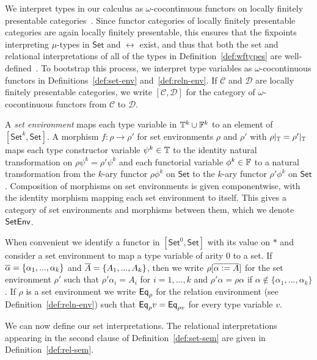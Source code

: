 \documentclass{lmcs}
\theoremstyle{plain}\newtheorem{satz}[thm]{Satz}
\newcommand{\set}{\mathsf{Set}}
\newcommand{\C}{\mathcal{C}}
\newcommand{\D}{\mathcal{D}}
\begin{document}
We interpret types in our calculus as $\omega$-cocontinuous functors
on locally finitely presentable categories~\cite{ar94}. Since functor
categories of locally finitely presentable categories are again
locally finitely presentable, this ensures that the fixpoints
interpreting $\mu$-types in $\set$ and $\rel$ exist, and thus that
both the set and relational interpretations of all of the types in
Definition~\ref{def:wftypes} are well-defined~\cite{jp19}. To
bootstrap this process, we interpret type variables as
$\omega$-cocontinuous functors in Definitions~\ref{def:set-env}
and~\ref{def:reln-env}. If $\C$ and $\D$ are locally finitely
presentable categories, we write $[\C,\D]$ for the category of
$\omega$-cocontinuous functors from $\C$ to $\D$.

\begin{defi}\label{def:set-env}
A {\em set environment} maps each type variable in $\mathbb{T}^k \cup
\mathbb{F}^k$ to an element of $[\set^k,\set]$.  A morphism $f : \rho \to
\rho'$ for set environments $\rho$ and $\rho'$ with $\rho|_{\mathbb{T}} =
\rho'|_{\mathbb{T}}$ maps each type constructor variable $\psi^k \in \mathbb{T}$
to the identity natural transformation on $\rho \psi^k = \rho'\psi^k$
and each functorial variable $\phi^k \in \mathbb{F}$ to a natural
transformation from the $k$-ary functor $\rho \phi^k$ on $\set$ to the
$k$-ary functor $\rho' \phi^k$ on $\set$.  Composition of morphisms on
set environments is given componentwise, with the identity morphism
mapping each set environment to itself. This gives a category of set
environments and morphisms between them, which we denote $\mathsf{SetEnv}$.
\end{defi}
When convenient we identify a functor in $[\set^0, \set]$ with its
value on $\ast$ and consider a set environment to map a type variable
of arity $0$ to a set.  If $\overline{\alpha} = \{\alpha_1,...,\alpha_k\}$
and $\overline{A} = \{A_1,...,A_k\}$, then we write $\rho[\overline{\alpha := A}]$
for the set environment $\rho'$ such that $\rho' \alpha_i = A_i$ for
$i = 1,...,k$ and $\rho' \alpha = \rho \alpha$ if $\alpha \not \in
\{\alpha_1,...,\alpha_k\}$.  If $\rho$ is a set environment we write
$\mathsf{Eq}_\rho$ for the relation environment (see
Definition~\ref{def:reln-env}) such that $\mathsf{Eq}_\rho v = \mathsf{Eq}_{\rho v}$
for every type variable $v$.

We can now define our set interpretations.  The relational
interpretations appearing in the second clause of
Definition~\ref{def:set-sem} are given in
Definition~\ref{def:rel-sem}.
\end{document}
